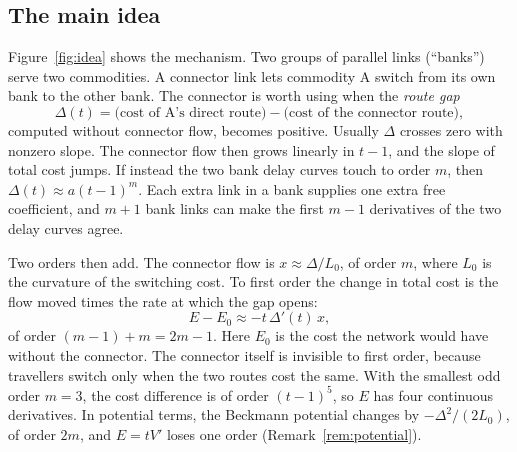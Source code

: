 \subsection{The main idea}\label{sec:mainidea}

Figure~\ref{fig:idea} shows the mechanism. Two groups of parallel links (``banks'') serve two commodities. A connector link lets commodity A switch from its own bank to the other bank. The connector is worth using when the \emph{route gap}
\[
\Delta(t)=\text{(cost of A's direct route)}-\text{(cost of the connector route)},
\]
computed without connector flow, becomes positive. Usually $\Delta$ crosses zero with nonzero slope. The connector flow then grows linearly in $t-1$, and the slope of total cost jumps. If instead the two bank delay curves touch to order $m$, then $\Delta(t)\approx a(t-1)^m$. Each extra link in a bank supplies one extra free coefficient, and $m+1$ bank links can make the first $m-1$ derivatives of the two delay curves agree.

Two orders then add. The connector flow is $x\approx\Delta/L_0$, of order $m$, where $L_0$ is the curvature of the switching cost. To first order the change in total cost is the flow moved times the rate at which the gap opens:
\[
E-E_0\approx -t\,\Delta'(t)\,x,
\]
of order $(m-1)+m=2m-1$. Here $E_0$ is the cost the network would have without the connector. The connector itself is invisible to first order, because travellers switch only when the two routes cost the same. With the smallest odd order $m=3$, the cost difference is of order $(t-1)^5$, so $E$ has four continuous derivatives. In potential terms, the Beckmann potential changes by $-\Delta^2/(2L_0)$, of order $2m$, and $E=tV'$ loses one order (Remark~\ref{rem:potential}).

